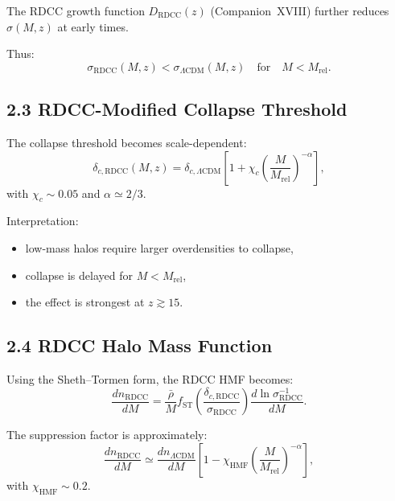 \documentclass[11pt,a4paper]{article}
\begin{document}
The RDCC growth function $D_{\mathrm{RDCC}}(z)$ (Companion~XVIII) further reduces 
$\sigma(M,z)$ at early times.

Thus:
\begin{equation}
    \sigma_{\mathrm{RDCC}}(M,z)
    < \sigma_{\Lambda\mathrm{CDM}}(M,z)
    \quad \text{for} \quad M < M_{\mathrm{rel}}.
\end{equation}

\subsection*{2.3 RDCC-Modified Collapse Threshold}

The collapse threshold becomes scale-dependent:
\begin{equation}
    \delta_{c,\mathrm{RDCC}}(M,z)
    = \delta_{c,\Lambda\mathrm{CDM}}
      \left[
        1 + \chi_{c}
        \left(\frac{M}{M_{\mathrm{rel}}}\right)^{-\alpha}
      \right],
\end{equation}
with $\chi_{c} \sim 0.05$ and $\alpha \simeq 2/3$.

Interpretation:

\begin{itemize}
    \item low-mass halos require larger overdensities to collapse,
    \item collapse is delayed for $M < M_{\mathrm{rel}}$,
    \item the effect is strongest at $z \gtrsim 15$.
\end{itemize}

\subsection*{2.4 RDCC Halo Mass Function}

Using the Sheth–Tormen form, the RDCC HMF becomes:
\begin{equation}
    \frac{dn_{\mathrm{RDCC}}}{dM}
    = \frac{\bar{\rho}}{M}
      f_{\mathrm{ST}}
      \left(
        \frac{\delta_{c,\mathrm{RDCC}}}{\sigma_{\mathrm{RDCC}}}
      \right)
      \frac{d\ln\sigma_{\mathrm{RDCC}}^{-1}}{dM}.
\end{equation}

The suppression factor is approximately:
\begin{equation}
    \frac{dn_{\mathrm{RDCC}}}{dM}
    \simeq
    \frac{dn_{\Lambda\mathrm{CDM}}}{dM}
    \left[
        1 - \chi_{\mathrm{HMF}}
        \left(\frac{M}{M_{\mathrm{rel}}}\right)^{-\alpha}
    \right],
\end{equation}
with $\chi_{\mathrm{HMF}} \sim 0.2$.
\end{document}
